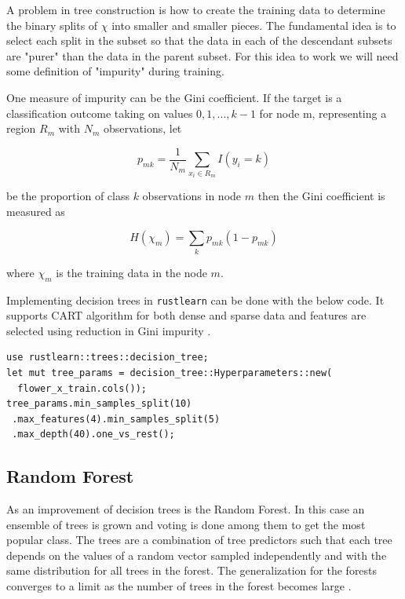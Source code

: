 \documentclass{book}
\begin{document}
A problem in tree construction is how to create the training data to determine the binary splits of $\chi$ into smaller and smaller pieces. The fundamental idea is to select each split in the subset so that the data in each of the descendant subsets are "purer" than the data in the parent subset. For this idea to work we will need some definition of "impurity" during training.

One measure of impurity can be the Gini coefficient. If the target is a classification outcome taking on values $0, 1, ..., k-1$ for node m, representing a region $R_m$ with $N_m$ observations, let

\begin{equation}
	p_{mk} = \frac{1}{N_m} \sum_{x_i \in R_m} I(y_i = k)
\end{equation}

be the proportion of class $k$ observations in node $m$ then the Gini coefficient is measured as

\begin{equation}
	H(\chi_m) = \sum_{k} p_{mk}(1-p_{mk})
\end{equation}

where $\chi_m$ is the training data in the node $m$.

Implementing decision trees in \lstinline{rustlearn} can be done with the below code. It supports CART algorithm for both dense and sparse data and features are selected using reduction in Gini impurity\cite{WEBSITE:4} .

\begin{lstlisting}[caption={chapter3\\/rustlearn\_classification\_tasks\\/src\\/trees\\.rs}]
use rustlearn::trees::decision_tree;
let mut tree_params = decision_tree::Hyperparameters::new(
  flower_x_train.cols());
tree_params.min_samples_split(10)
 .max_features(4).min_samples_split(5)
 .max_depth(40).one_vs_rest();
\end{lstlisting}

\label{sub:Decision trees}

\subsection{Random Forest}%
As an improvement of decision trees is the Random Forest. In this case an ensemble of trees is grown and voting is done among them to get the most popular class. The trees are a combination of tree predictors such that each tree depends on the values of a random vector sampled independently and with the same distribution for all trees in the forest. The generalization for the forests converges to a limit as the number of trees in the forest becomes large\cite{WEBSITE:7} .
\end{document}
